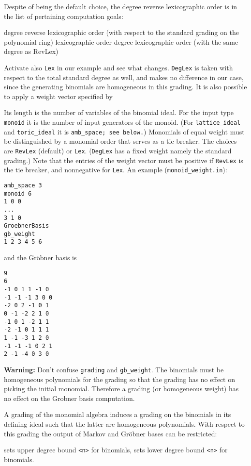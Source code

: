 Despite of being the default choice, the degree reverse lexicographic order is in the list of pertaining computation goals:
\begin{itemize}
	\itemtt[RevLex] degree reverse lexicographic order (with respect to the standard grading on the polynomial ring)
	\itemtt[Lex] lexicographic order
	\itemtt[DegLex] degree lexicographic order (with the same degree as RevLex)
\end{itemize}
Activate also \verb|Lex| in our example and see what changes. \verb|DegLex| is taken with respect to the total standard degree as well, and makes no difference in our case, since the generating binomials are homogeneous in this grading. It is also possible to apply a weight vector specified by 
\begin{itemize}
	\itemtt[gb\_weight]
\end{itemize}
Its length is the number of variables of the binomial ideal. For the input type \verb|monoid| it is the number of input generators of the monoid. (For \verb|lattice_ideal| and  \verb|toric_ideal| it is \verb|amb_space; see below.|) Monomials of equal weight must be distinguished by a monomial order that serves as a tie breaker. The choices are \verb|RevLex| (default) or \verb|Lex|. (\verb|DegLex| has a fixed weight namely the standard grading.) Note that the entries of the weight vector must be positive if \verb|RevLex| is the tie breaker, and nonnegative for \verb|Lex|. An example (\verb|monoid_weight.in|):
\begin{Verbatim}
amb_space 3
monoid 6
1 0 0
...
3 1 0
GroebnerBasis
gb_weight
1 2 3 4 5 6
\end{Verbatim}
and the Gröbner basis is
\begin{Verbatim}
9
6
-1 0 1 1 -1 0 
-1 -1 -1 3 0 0 
-2 0 2 -1 0 1 
0 -1 -2 2 1 0 
-1 0 1 -2 1 1 
-2 -1 0 1 1 1 
1 -1 -3 1 2 0 
-1 -1 -1 0 2 1 
2 -1 -4 0 3 0
\end{Verbatim}

\textbf{Warning:} \enspace Don't confuse \verb|grading| and \verb|gb_weight|. The binomials must be homogeneous polynomials for the grading so that the grading has no effect on picking the initial monomial. Therefore a grading (or homogeneous weight) has no effect on the Grobner basis computation.

A grading of the monomial algebra induces a grading on the binomials in its defining ideal such that the latter are homogeneous polynomials. With respect to this grading  the output of Markov and Gröbner bases can be restricted:
\begin{itemize}
	 sets upper degree bound \verb|<n>| for binomials,
	 sets lower degree bound  \verb|<n>| for binomials. 
\end{itemize}

